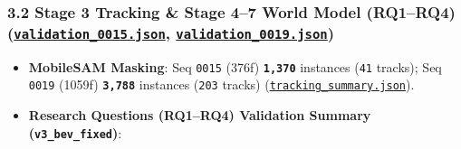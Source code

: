 \documentclass[10.5pt,a4paper]{article}
\begin{document}
\subsubsection{3.2 Stage 3 Tracking \& Stage 4--7 World Model (RQ1--RQ4) (\href{https://github.com/Heisnotanimposter/Totalcare\_autonomous\_driving\_Yolov5/blob/main/results/v3\_bev\_fixed/world\_outputs/validation\_0015.json}{\texttt{validation\_\allowbreak{}0015.\allowbreak{}json}}, \href{https://github.com/Heisnotanimposter/Totalcare\_autonomous\_driving\_Yolov5/blob/main/results/v3\_bev\_fixed/world\_outputs/validation\_0019.json}{\texttt{validation\_\allowbreak{}0019.\allowbreak{}json}})}

\begin{itemize}[leftmargin=1.5em,itemsep=2pt]
\item \textbf{MobileSAM Masking}: Seq \texttt{0015} (376f) \textbf{\texttt{1,\allowbreak{}370}} instances (\texttt{41} tracks); Seq \texttt{0019} (1059f) \textbf{\texttt{3,\allowbreak{}788}} instances (\texttt{203} tracks) (\href{https://github.com/Heisnotanimposter/Totalcare\_autonomous\_driving\_Yolov5/blob/main/results/v2\_improved/outputs/tracking\_summary.json}{\texttt{tracking\_\allowbreak{}summary.\allowbreak{}json}}).
\item \textbf{Research Questions (RQ1--RQ4) Validation Summary (\texttt{v3\_\allowbreak{}bev\_\allowbreak{}fixed})}:
\end{itemize}
\end{document}
